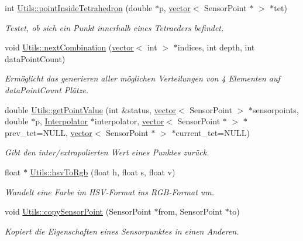 \begin{DoxyCompactItemize}
int \hyperlink{namespaceUtils_a40eaef4d22da849a5deb2f1153d88bbc}{Utils\-::point\-Inside\-Tetrahedron} (double $\ast$p, \hyperlink{classstd_1_1vector}{vector}$<$ Sensor\-Point $\ast$ $>$ $\ast$tet)
\begin{DoxyCompactList}\small\item\em Testet, ob sich ein Punkt innerhalb eines Tetraeders befindet. \end{DoxyCompactList}\item 
void \hyperlink{namespaceUtils_af4ba26e928c7cef5269c51bfac49d547}{Utils\-::next\-Combination} (\hyperlink{classstd_1_1vector}{vector}$<$ int $>$ $\ast$indices, int depth, int data\-Point\-Count)
\begin{DoxyCompactList}\small\item\em Ermöglicht das generieren aller möglichen Verteilungen von 4 Elementen auf data\-Point\-Count Plätze. \end{DoxyCompactList}\item 
double \hyperlink{namespaceUtils_a6a0ae18a42e2d206bc1b43da27820fe2}{Utils\-::get\-Point\-Value} (int \&status, \hyperlink{classstd_1_1vector}{vector}$<$ Sensor\-Point $>$ $\ast$sensorpoints, double $\ast$p, \hyperlink{classInterpolator}{Interpolator} $\ast$interpolator, \hyperlink{classstd_1_1vector}{vector}$<$ Sensor\-Point $\ast$ $>$ $\ast$prev\-\_\-tet=N\-U\-L\-L, \hyperlink{classstd_1_1vector}{vector}$<$ Sensor\-Point $\ast$ $>$ $\ast$current\-\_\-tet=N\-U\-L\-L)
\begin{DoxyCompactList}\small\item\em Gibt den inter/extrapolierten Wert eines Punktes zurück. \end{DoxyCompactList}\item 
float $\ast$ \hyperlink{namespaceUtils_a5d6523eb946892eee52c9c74efd016de}{Utils\-::hsv\-To\-Rgb} (float h, float s, float v)
\begin{DoxyCompactList}\small\item\em Wandelt eine Farbe im H\-S\-V-\/\-Format ins R\-G\-B-\/\-Format um. \end{DoxyCompactList}\item 
void \hyperlink{namespaceUtils_adc0438a85ca31977c95f5d27090d5346}{Utils\-::copy\-Sensor\-Point} (Sensor\-Point $\ast$from, Sensor\-Point $\ast$to)
\begin{DoxyCompactList}\small\item\em Kopiert die Eigenschaften eines Sensorpunktes in einen Anderen. \end{DoxyCompactList}\end{DoxyCompactItemize}
